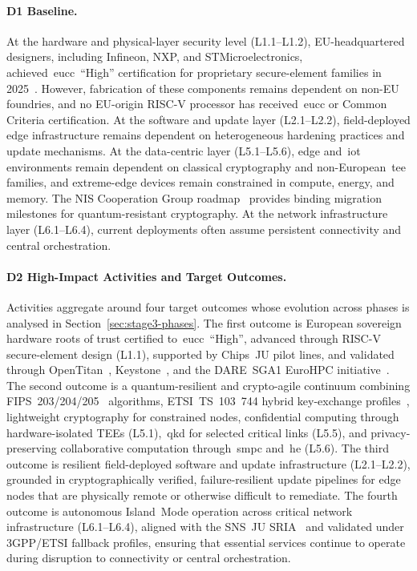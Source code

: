 \documentclass{ieeeaccess}
\begin{document}
\paragraph{D1 Baseline.}
At the hardware and physical-layer security level (L1.1--L1.2), EU-headquartered designers, including Infineon, NXP, and STMicroelectronics, achieved~\gls{eucc}~``High'' certification for proprietary secure-element families in 2025~\cite{enisaeucc2025}. However, fabrication of these components remains dependent on non-EU foundries, and no EU-origin RISC-V processor has received~\gls{eucc} or Common Criteria certification. At the software and update layer (L2.1--L2.2), field-deployed edge infrastructure remains dependent on heterogeneous hardening practices and update mechanisms. At the data-centric layer (L5.1--L5.6), edge and~\gls{iot} environments remain dependent on classical cryptography and non-European~\gls{tee} families, and extreme-edge devices remain constrained in compute, energy, and memory. The NIS Cooperation Group roadmap~\cite{niscg2025pqc} provides binding migration milestones for quantum-resistant cryptography. At the network infrastructure layer (L6.1--L6.4), current deployments often assume persistent connectivity and central orchestration.

\paragraph{D2 High-Impact Activities and Target Outcomes.}
Activities aggregate around four target outcomes whose evolution across phases is analysed in Section~\ref{sec:stage3-phases}. The first outcome is European sovereign hardware roots of trust certified to~\gls{eucc}~``High'', advanced through RISC-V secure-element design (L1.1), supported by Chips~JU pilot lines, and validated through OpenTitan~\cite{opentitan2024}, Keystone~\cite{keystone2020}, and the DARE~SGA1 EuroHPC initiative~\cite{eurohpcdare2025}. The second outcome is a quantum-resilient and crypto-agile continuum combining FIPS~203/204/205~\cite{nistfips203,nistfips204,nistfips205} algorithms, ETSI~TS~103~744 hybrid key-exchange profiles~\cite{etsiqshybrid}, lightweight cryptography for constrained nodes, confidential computing through hardware-isolated TEEs (L5.1),~\gls{qkd} for selected critical links (L5.5), and privacy-preserving collaborative computation through~\gls{smpc} and~\gls{he} (L5.6). The third outcome is resilient field-deployed software and update infrastructure (L2.1--L2.2), grounded in cryptographically verified, failure-resilient update pipelines for edge nodes that are physically remote or otherwise difficult to remediate. The fourth outcome is autonomous Island~Mode operation across critical network infrastructure (L6.1--L6.4), aligned with the SNS~JU SRIA~\cite{snsju2023} and validated under 3GPP/ETSI fallback profiles, ensuring that essential services continue to operate during disruption to connectivity or central orchestration.
\end{document}
